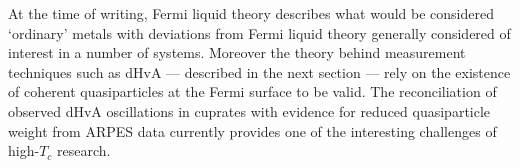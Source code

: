 At the time of writing, Fermi liquid theory describes what would be considered `ordinary' metals with deviations from Fermi liquid theory generally considered of interest in a number of systems. Moreover the theory behind measurement techniques such as \ac{dHvA} --- described in the next section --- rely on the existence of coherent quasiparticles at the Fermi surface to be valid. The reconciliation of observed \ac{dHvA} oscillations in cuprates with evidence for reduced quasiparticle weight from \ac{ARPES} data currently provides one of the interesting challenges of high-$T_c$ research.

